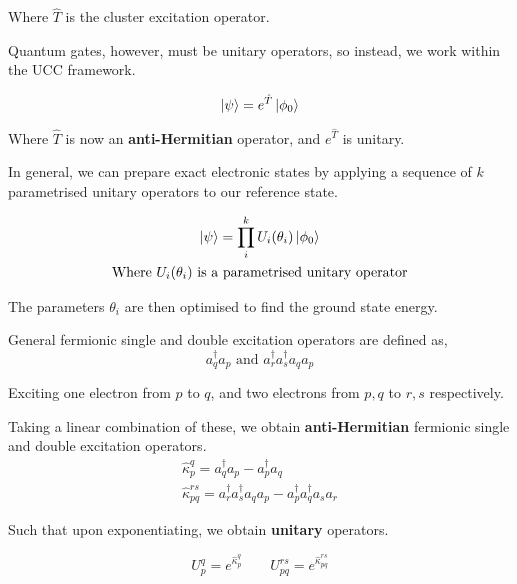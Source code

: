 Where $\hat T$ is the cluster excitation operator.

Quantum gates, however, must be unitary operators, so instead, we work within the UCC framework.

\begin{equation*}
    \ket\psi = e^{\hat T} \ket{\phi_0}
\end{equation*}

Where $\hat T$ is now an \textbf{anti-Hermitian} operator, and $e^{\hat T}$ is unitary.

In general, we can prepare exact electronic states by applying a sequence of $k$ parametrised unitary operators to our reference state.

\begin{equation*}
\begin{gathered}
    \ket\psi = \prod_i^k U_i(\theta_i) \ket{\phi_0} \\
    \text{Where $U_i(\theta_i)$ is a parametrised unitary operator}
\end{gathered}
\end{equation*}\smallskip

The parameters $\theta_i$ are then optimised to find the ground state energy.

General fermionic single and double excitation operators are defined as,
\begin{equation*}
    a_q^\dagger a_p \text{ and } a_r^\dagger a_s^\dagger a_q a_p
\end{equation*}

Exciting one electron from $p$ to $q$, and two electrons from $p, q$ to $r, s$ respectively.

Taking a linear combination of these, we obtain \textbf{anti-Hermitian} fermionic single and double excitation operators.
\begin{equation*}
\begin{gathered}
    \hat\kappa_p^q = a_q^\dagger a_p - a_p^\dagger a_q \\
    \hat\kappa_{pq}^{rs} =
    a_r^\dagger a_s^\dagger a_q a_p - a_p^\dagger a_q^\dagger a_s a_r
\end{gathered}
\end{equation*}\smallskip

Such that upon exponentiating, we obtain \textbf{unitary} operators.

\begin{equation*}
    U^q_p = e^{\hat\kappa_p^q} \qquad
    U_{pq}^{rs} = e^{\hat\kappa_{pq}^{rs}}
\end{equation*}

